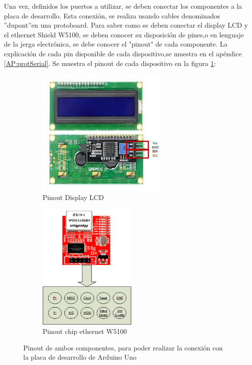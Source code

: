 Una vez, definidos los puertos a utilizar, se deben conectar los componentes a la placa de desarrollo. Esta conexión, se realiza usando cables denominados ''dupont''en una protoboard. 
Para saber como se deben conectar el display LCD y el ethernet Shield W5100, se deben conocer su disposición de pines,o en lenguaje de la jerga electrónica, se debe conocer el "pinout" de cada componente. La explicación de cada pin disponible de cada dispositivo,se muestra en el apéndice \ref{AP:protSerial}. Se muestra el pinout  de cada dispositivo en la figura \ref{fig:pinoutlcdeth}: 

\setlength{\textwidth}{190mm}

\begin{figure}[ht]
	\begin{subfigure}{0.5\textwidth}
		\centering	
		\includegraphics[height=6.3cm]{pinout LCD}
		\caption{Pinout Display LCD }		
	\end{subfigure}
	\hspace{-30mm}
	\begin{subfigure}{0.5\textwidth}		
		\centering
		 
		\includegraphics[height=6.3cm]{pinoutW5100}
		\caption{Pinout chip ethernet W5100}	
	\end{subfigure}
	
	\caption{Pinout de ambos componentes, para poder realizar la conexión con la placa de desarrollo de Arduino Uno}
	\label{fig:pinoutlcdeth}
\end{figure}
\setlength{\textwidth}{150mm}

